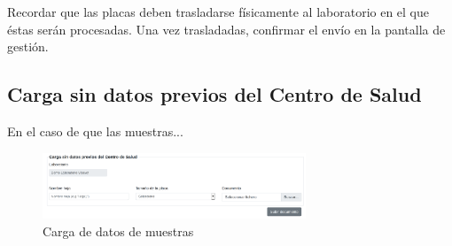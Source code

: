 \documentclass[a4paper,spanish]{paper}
\begin{document}
\medskip
\begin{tcolorbox}[colback=blue!3!white,colframe=blue(ryb)!50!black,title=\textbf{Tip}]

Recordar que las placas deben trasladarse físicamente al laboratorio en el que éstas serán procesadas. Una vez trasladadas, confirmar el envío en la pantalla de gestión.

\end{tcolorbox}

\subsection{Carga sin datos previos del Centro de Salud}

En el caso de que las muestras...

\begin{figure}[h]
\centering
\includegraphics[width=0.7\textwidth]{Figs/Fig23.png}
\caption{Carga de datos de muestras}
\label{Fig23}
\end{figure}



\newpage %



\end{document}
